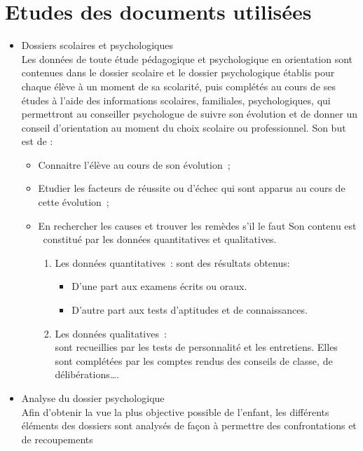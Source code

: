 \section{Etudes des documents utilisées}
\begin{itemize}[label=\textbullet]
	\item Dossiers scolaires et psychologiques \\
	Les données de toute étude pédagogique et psychologique en orientation  sont contenues dans le dossier scolaire et le dossier psychologique établis pour chaque élève à un moment de sa scolarité, puis complétés au cours de ses études à l’aide des informations scolaires, familiales, psychologiques, qui permettront au conseiller psychologue de suivre son évolution et de donner un conseil d’orientation au moment du choix scolaire ou professionnel.
Son but est de : 
	\begin{itemize}
		\item Connaitre l’élève au cours de son évolution ;
		\item Etudier les facteurs de réussite ou d’échec qui sont apparus au cours de cette évolution ;
		\item En rechercher les causes et trouver les remèdes s’il le faut
	Son contenu est  constitué par les données quantitatives et qualitatives.
		\begin{enumerate}
			\item Les données quantitatives : sont des résultats obtenus:\\
				\begin{itemize}
					\item D’une part aux examens écrits ou oraux.
					\item D’autre part aux tests d’aptitudes et de connaissances.
				\end{itemize}
			\item Les données qualitatives : \\
			 sont recueillies par les tests de personnalité et les entretiens. Elles sont complétées par les comptes rendus des conseils de classe, de délibérations….
		\end{enumerate}
	\end{itemize}
	\item Analyse du dossier psychologique\\
	Afin d’obtenir la vue la plus objective possible de l’enfant, les différents éléments des dossiers sont analysés de façon à permettre des confrontations et de recoupements
\begin{enumerate}

\end{enumerate}
\end{itemize}
